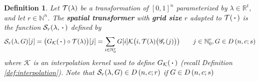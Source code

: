 \documentclass{article}
\newcommand{\R}{\mathbb{R}}
\newcommand{\Natural}{\mathbb{N}}
\newtheorem{defn}{Definition}
\begin{document}
	\newcommand{\spatialtransf}{\mathcal{S}}
	\begin{defn}\label{def:spatial_transformer}
		Let \(\mathcal{T}(\lambda)\) be a transformation of \([0,1]^n\) parameterized by \(\lambda \in \R^t\), and let \(r \in \Natural^n\). The \textbf{spatial transformer} with \textbf{grid size} \(r\) adapted to \(\mathcal{T}(\,\boldsymbol{\cdot}\,)\) is the function \(\spatialtransf_r(\lambda, \blah)\) defined by
		\begin{equation}\label{eq:spatial_transformer}
			\spatialtransf_r(\lambda, G)[j] = \big(G_\mathcal{K}(\blah) \circ \transf(\lambda)\big)[j] = \sum_{i \in \Natural_0^s}G[i]\mathcal{K}\big(i,\transf(\lambda)\big(\grid_r(j)\big)\big)\qquad j \in \Natural_0^r, G \in \discim{n}{c}{s}
		\end{equation}
		where \(\mathcal{K}\) is an interpolation kernel used to define \(G_\mathcal{K}(\,\boldsymbol{\cdot}\,)\) (recall Definition \ref{def:interpolation}). Note that \(\spatialtransf_r(\lambda, G) \in \discim{n}{c}{r}\) if \(G \in {D\left(n, c; s\right)}\)
	\end{defn}
	
\end{document}
